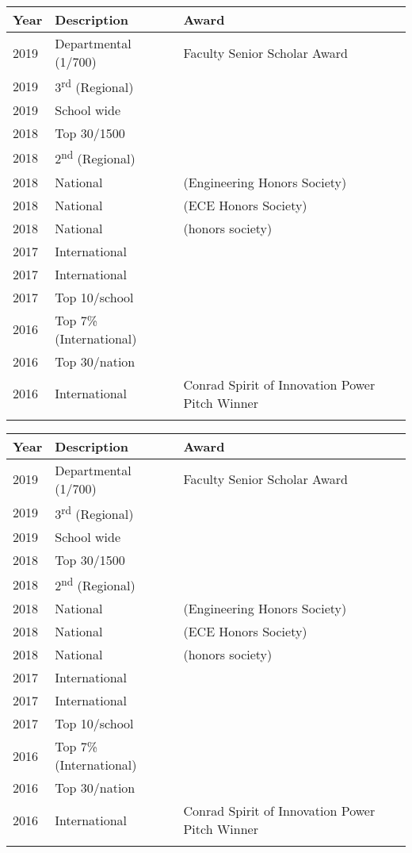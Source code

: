 \newcommand{\awardscontent}{%
	\textbf{Year}        &
	\textbf{Description} &
	\textbf{Award}                                                                                                \\
	\midrule
	\awardshigh{}2019    & Departmental (1/700)             & Faculty Senior Scholar Award                        \\
	\awardslow{}2019     & 3\textsuperscript{rd} (Regional) & \ieeeweb{IEEE Website Design Competition}           \\
	\awardslow{}2019     & School wide                      & \fintech{Carolina FinTech University Winner}        \\
	\awardshigh{}2018    & Top 30/1500                      & \nba{NBA Hackathon Finalist}                        \\
	\awardshigh{}2018    & 2\textsuperscript{nd} (Regional) & \ieeehacks{IEEE SouthEastCon Hackathon}             \\
	\awardslow{}2018     & National                         & \tbp{Tau Beta Pi} (Engineering Honors Society)      \\
	\awardslow{}2018 & National                         & \hkn{IEEE Eta Kappa Nu} (ECE Honors Society)        \\
	\awardslow{}2018     & National                         & \pkp{Phi Kappa Phi} (honors society)                \\
	\awardshigh{}2017    & International                    & \first{\acr{FIRST} Robotics World Quarter Finalist} \\
	\awardshigh{}2017    & International                    & \ibm{IBM Watson Scholar}                            \\
	\awardslow{}2017     & Top 10/school                    & \bbs{Bowman Brockman Endowded Scholar}              \\
	\awardshigh{}2016    & Top 7\% (International)          & \himcm{HiMCM Finalist}                              \\
	\awardshigh{}2016    & Top 30/nation                    & \beaver{MIT Beaverworks Robotics Institute}         \\
	\awardslow{}2016     & International                    & Conrad Spirit of Innovation Power Pitch Winner      \\
}

\makeatletter%
\if@twocolumn%
	\renewcommand{\arraystretch}{1.1}
	\begin{table}[h!]
		\small
		\begin{tabularx}{\columnwidth}{l l p{5.2cm}}
			\awardscontent{}
		\end{tabularx}
	\end{table}
\else%
	\begin{table}[h!]
		\begin{tabular}{lll}
			\awardscontent{}
		\end{tabular}
	\end{table}
	\FloatBarrier%
\fi
\makeatother

